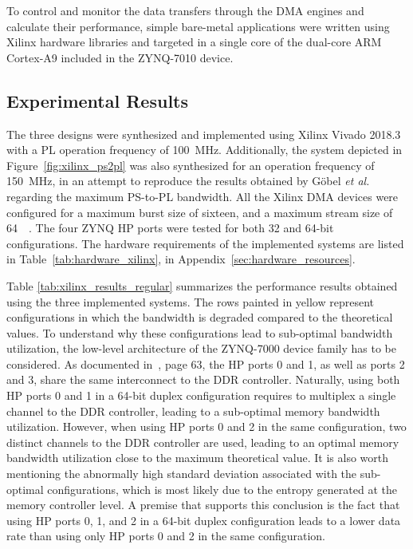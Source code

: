 To control and monitor the data transfers through the \ac{DMA} engines and calculate their performance, simple bare-metal applications were written using Xilinx hardware libraries and targeted in a single core of the dual-core ARM Cortex-A9 included in the ZYNQ-7010 device.


\subsection{Experimental Results}

The three designs were synthesized and implemented using Xilinx Vivado 2018.3 with a \ac{PL} operation frequency of \SI{100}{\mega\hertz}. Additionally, the system depicted in Figure~\ref{fig:xilinx_ps2pl} was also synthesized for an operation frequency of \SI{150}{\mega\hertz}, in an attempt to reproduce the results obtained by G{\"{o}}bel \textit{et al.} regarding the maximum \ac{PS}-to-\ac{PL} bandwidth. All the Xilinx \ac{DMA} devices were configured for a maximum burst size of sixteen, and a maximum stream size of \SI{64}{\mebi\byte}. The four ZYNQ \ac{HP} ports were tested for both 32 and 64-bit configurations. The hardware requirements of the implemented systems are listed in Table~\ref{tab:hardware_xilinx}, in Appendix~\ref{sec:hardware_resources}.

Table \ref{tab:xilinx_results_regular} summarizes the performance results obtained using the three implemented systems. The rows painted in yellow represent configurations in which the bandwidth is degraded compared to the theoretical values. To understand why these configurations lead to sub-optimal bandwidth utilization, the low-level architecture of the ZYNQ-7000 device family has to be considered. As documented in~\cite{xilinx2015zynq}, page 63, the \ac{HP} ports 0 and 1, as well as ports 2 and 3, share the same interconnect to the DDR controller. Naturally, using both \ac{HP} ports 0 and 1 in a 64-bit duplex configuration requires to multiplex a single channel to the DDR controller, leading to a sub-optimal memory bandwidth utilization. However, when using \ac{HP} ports 0 and 2 in the same configuration, two distinct channels to the DDR controller are used, leading to an optimal memory bandwidth utilization close to the maximum theoretical value. It is also worth mentioning the abnormally high standard deviation associated with the sub-optimal configurations, which is most likely due to the entropy generated at the memory controller level. A premise that supports this conclusion is the fact that using \ac{HP} ports 0, 1, and 2 in a 64-bit duplex configuration leads to a lower data rate than using only \ac{HP} ports 0 and 2 in the same configuration.

